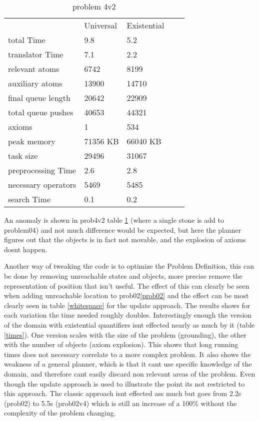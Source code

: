 			\begin{table}[h]
				\centering
				\caption{problem 4v2}
				\label{prob4v2}
				\begin{tabular}{lllll}
					& Universal & Existential  \\
					total Time & 9.8 & 5.2 \\
					translator Time& 7.1  & 2.2 \\
					
					
					relevant atoms & 6742 & 8199\\
					auxiliary atoms & 13900 & 14710\\
					final queue length & 20642 & 22909\\
					total queue pushes & 40653 & 44321\\
					axioms & 1 & 534 \\ 
					peak memory & 71356 KB & 66040 KB\\ 
					task size &29496 & 31067 \\
					
					
					preprocessing Time & 2.6 & 2.8 \\
					necessary operators & 5469 & 5485 \\
					
					
					search Time & 0.1 & 0.2 \\
				\end{tabular}
			\end{table}
			An anomaly is shown in prob4v2 table \ref{prob4v2} (where a single stone is add to problem04) and not much difference would be expected, but here the planner figures out that the objects is in fact not movable, and the explosion of axioms dosnt happen. 
			
			Another way of tweaking the code is to optimize the Problem Definition, this can be done by removing unreachable states and objects, more precise remove the representation of position that isn't useful. The effect of this can clearly be seen when adding unreachable location to prob02\ref{prob02} and the effect can be most clearly seen in table \ref{whitespace} for the update approach. The results shows for each variation the time needed roughly doubles. Interestingly enough the version of the domain with existential quantifiers isnt effected nearly as much by it (table \ref{times}). One version scales with the size of the problem (grounding), the other with the number of objects (axiom explosion). This shows that long running times does not necessary correlate to a more complex problem. It also shows the weakness of a general planner, which is that it cant use specific knowledge of the domain, and therefore cant easily discard non relevant areas of the problem. Even though the update approach is used to illustrate the point its not restricted to this approach. The classic approach isnt effected ass much but goes from 2.2s (prob02) to 5.5s (prob02v4) which is still an increase of a 100\% without the complexity of the problem changing.
			

